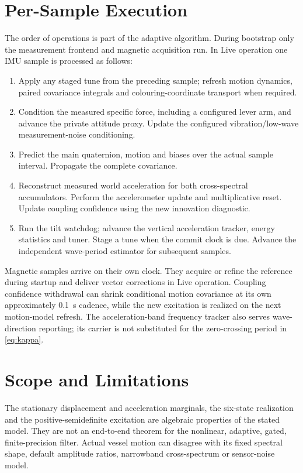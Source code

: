 \documentclass[conference]{IEEEtran}
\begin{document}
\section{Per-Sample Execution}
\label{sec:execution}
The order of operations is part of the adaptive algorithm. During
bootstrap only the measurement frontend and magnetic acquisition run.
In Live operation one IMU sample is processed as follows:
\begin{enumerate}
 \item Apply any staged tune from the preceding sample; refresh motion
 dynamics, paired covariance integrals and colouring-coordinate transport
 when required.
 \item Condition the measured specific force, including a configured
 lever arm, and advance the private attitude proxy. Update the configured
 vibration/low-wave measurement-noise conditioning.
 \item Predict the main quaternion, motion and biases over the actual
 sample interval. Propagate the complete covariance.
 \item Reconstruct measured world acceleration for both cross-spectral
 accumulators. Perform the accelerometer update and multiplicative reset.
 Update coupling confidence using the new innovation diagnostic.
 \item Run the tilt watchdog; advance the vertical acceleration tracker,
 energy statistics and tuner. Stage a tune when the commit clock is due.
 Advance the independent wave-period estimator for subsequent samples.
\end{enumerate}
Magnetic samples arrive on their own clock. They acquire or refine the
reference during startup and deliver vector corrections in Live
operation. Coupling confidence withdrawal can shrink conditional motion
covariance at its own approximately 0.1~s cadence, while the new excitation
is realized on the next motion-model refresh. The acceleration-band
frequency tracker also serves wave-direction reporting; its carrier is
not substituted for the zero-crossing period in \cref{eq:kappa}.





\section{Scope and Limitations}
\label{sec:scope}
The stationary displacement and acceleration marginals, the six-state
realization and the positive-semidefinite excitation are algebraic
properties of the stated model. They are not an end-to-end theorem for
the nonlinear, adaptive, gated, finite-precision filter. Actual vessel
motion can disagree with its fixed spectral shape, default amplitude
ratios, narrowband cross-spectrum or sensor-noise model.
\end{document}
